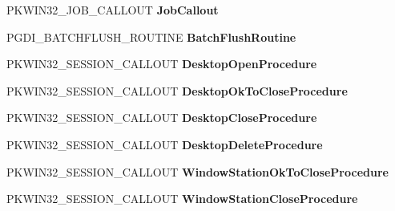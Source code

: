 \begin{DoxyCompactItemize}
P\+K\+W\+I\+N32\+\_\+\+J\+O\+B\+\_\+\+C\+A\+L\+L\+O\+UT {\bfseries Job\+Callout}
\item 
\mbox{\label{struct___w_i_n32___c_a_l_l_o_u_t_s___f_p_n_s_ae4d8886cdffaef519c37aae506e2dabf}} 
P\+G\+D\+I\+\_\+\+B\+A\+T\+C\+H\+F\+L\+U\+S\+H\+\_\+\+R\+O\+U\+T\+I\+NE {\bfseries Batch\+Flush\+Routine}
\item 
\mbox{\label{struct___w_i_n32___c_a_l_l_o_u_t_s___f_p_n_s_aa7291270e8a5b34afe0e825ff227409e}} 
P\+K\+W\+I\+N32\+\_\+\+S\+E\+S\+S\+I\+O\+N\+\_\+\+C\+A\+L\+L\+O\+UT {\bfseries Desktop\+Open\+Procedure}
\item 
\mbox{\label{struct___w_i_n32___c_a_l_l_o_u_t_s___f_p_n_s_a4dc237e5cb158943e987636daa32e014}} 
P\+K\+W\+I\+N32\+\_\+\+S\+E\+S\+S\+I\+O\+N\+\_\+\+C\+A\+L\+L\+O\+UT {\bfseries Desktop\+Ok\+To\+Close\+Procedure}
\item 
\mbox{\label{struct___w_i_n32___c_a_l_l_o_u_t_s___f_p_n_s_aa8a7e0b1f165f925f66d4c7c83f7f10a}} 
P\+K\+W\+I\+N32\+\_\+\+S\+E\+S\+S\+I\+O\+N\+\_\+\+C\+A\+L\+L\+O\+UT {\bfseries Desktop\+Close\+Procedure}
\item 
\mbox{\label{struct___w_i_n32___c_a_l_l_o_u_t_s___f_p_n_s_aa805607b219176a6c44c4006d411b479}} 
P\+K\+W\+I\+N32\+\_\+\+S\+E\+S\+S\+I\+O\+N\+\_\+\+C\+A\+L\+L\+O\+UT {\bfseries Desktop\+Delete\+Procedure}
\item 
\mbox{\label{struct___w_i_n32___c_a_l_l_o_u_t_s___f_p_n_s_a0a6f8155e776b99629431a209789571d}} 
P\+K\+W\+I\+N32\+\_\+\+S\+E\+S\+S\+I\+O\+N\+\_\+\+C\+A\+L\+L\+O\+UT {\bfseries Window\+Station\+Ok\+To\+Close\+Procedure}
\item 
\mbox{\label{struct___w_i_n32___c_a_l_l_o_u_t_s___f_p_n_s_af34d625cec5395ac32895a541f302d89}} 
P\+K\+W\+I\+N32\+\_\+\+S\+E\+S\+S\+I\+O\+N\+\_\+\+C\+A\+L\+L\+O\+UT {\bfseries Window\+Station\+Close\+Procedure}
\item 
\mbox{\label{struct___w_i_n32___c_a_l_l_o_u_t_s___f_p_n_s_a44b1191b06b53c39415c3328edeb6f26}} 

\end{DoxyCompactItemize}
